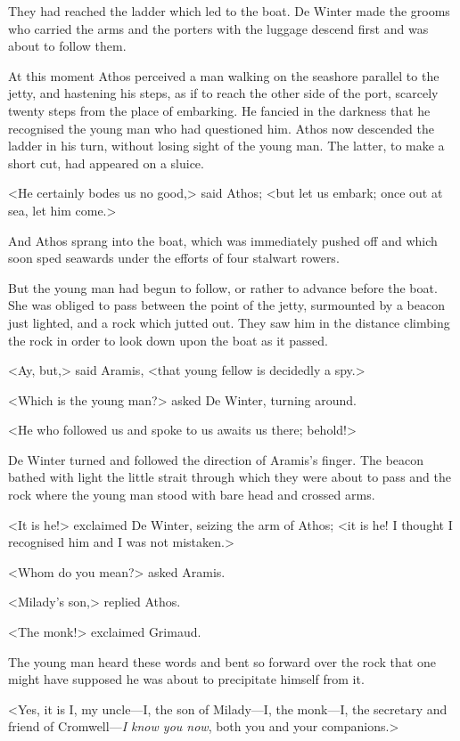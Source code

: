 They had reached the ladder which led to the boat. De Winter made the grooms who carried the arms and the porters with the luggage descend first and was about to follow them.

At this moment Athos perceived a man walking on the seashore parallel to the jetty, and hastening his steps, as if to reach the other side of the port, scarcely twenty steps from the place of embarking. He fancied in the darkness that he recognised the young man who had questioned him. Athos now descended the ladder in his turn, without losing sight of the young man. The latter, to make a short cut, had appeared on a sluice.

<He certainly bodes us no good,> said Athos; <but let us embark; once out at sea, let him come.>

And Athos sprang into the boat, which was immediately pushed off and which soon sped seawards under the efforts of four stalwart rowers.

But the young man had begun to follow, or rather to advance before the boat. She was obliged to pass between the point of the jetty, surmounted by a beacon just lighted, and a rock which jutted out. They saw him in the distance climbing the rock in order to look down upon the boat as it passed.

<Ay, but,> said Aramis, <that young fellow is decidedly a spy.>

<Which is the young man?> asked De Winter, turning around.

<He who followed us and spoke to us awaits us there; behold!>

De Winter turned and followed the direction of Aramis's finger. The beacon bathed with light the little strait through which they were about to pass and the rock where the young man stood with bare head and crossed arms.

<It is he!> exclaimed De Winter, seizing the arm of Athos; <it is he! I thought I recognised him and I was not mistaken.>

<Whom do you mean?> asked Aramis.

<Milady's son,> replied Athos.

<The monk!> exclaimed Grimaud.

The young man heard these words and bent so forward over the rock that one might have supposed he was about to precipitate himself from it.

<Yes, it is I, my uncle—I, the son of Milady—I, the monk—I, the secretary and friend of Cromwell—\textit{I know you now}, both you and your companions.>

